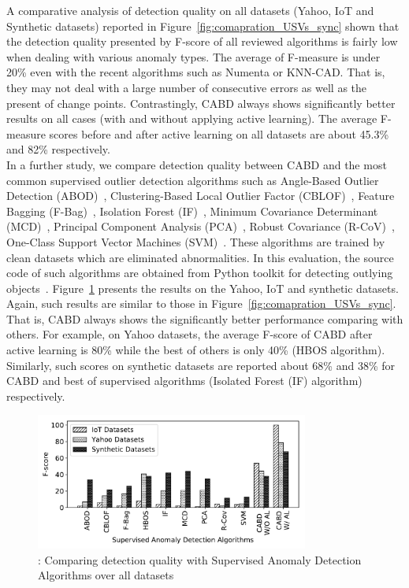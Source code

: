 A comparative analysis of detection quality on all datasets (Yahoo, IoT and Synthetic datasets) reported in Figure~\ref{fig:comapration_USVs_sync} shown that the detection quality presented by F-score of all reviewed algorithms is fairly low when dealing with various anomaly types. The average of F-measure is under 20\% even with the recent algorithms such as Numenta or KNN-CAD. That is, they may not deal with a large number of consecutive errors as well as the present of change points. Contrastingly, CABD always shows significantly better results on all cases (with and without applying active learning). The average F-measure scores before and after active learning on all datasets are about 45.3\% and 82\% respectively. \\


In a further study, we compare detection quality between CABD and the most common supervised outlier detection algorithms such as 
Angle-Based Outlier Detection (ABOD)~\cite{kriegel2008angle},
Clustering-Based Local Outlier Factor (CBLOF)~\cite{he2003discovering},
Feature Bagging (F-Bag)~\cite{lazarevic2005feature},
Isolation Forest (IF)~\cite{liu2008isolation},
Minimum Covariance Determinant (MCD)~\cite{hardin2004outlier},
Principal Component Analysis (PCA)~\cite{shyu2003novel},
Robust Covariance (R-CoV)~\cite{rousseeuw1999fast}, 
One-Class Support Vector Machines (SVM)~\cite{ma2003time}. 
These algorithms are trained by clean datasets which are eliminated abnormalities. In this evaluation, the source code of such algorithms are obtained from Python toolkit for detecting outlying objects~\cite{pyod}. Figure~\ref{fig:comapration_SVs_yahoo} presents the results on the Yahoo, IoT and synthetic datasets. Again, such results are similar to those in Figure~\ref{fig:comapration_USVs_sync}. That is, CABD always shows the significantly better performance comparing with others. For example, on Yahoo datasets, the average F-score of CABD after active learning is 80\% while the best of others is only 40\% (HBOS algorithm). Similarly, such scores on synthetic datasets are reported about 68\% and 38\% for CABD and best of supervised algorithms (Isolated Forest (IF) algorithm) respectively.

\begin{figure}[h]
	\centering
	\includegraphics[width=0.8\textwidth]{Part3/Chapter7/figures/SVs_compare_yahoo_synthetic.pdf}
	\caption{ : Comparing detection quality with Supervised Anomaly Detection Algorithms over all datasets}
	\label{fig:comapration_SVs_yahoo}
\end{figure}

